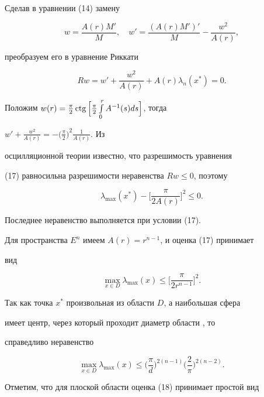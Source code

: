 \begin{pf} 


Сделав в уравнении (14) замену 


$$ 


w=\frac{A(r)M'}{M},\quad 


w'=\frac{(A(r)M')'}{M}-\frac{w^2}{A(r)}, 


$$ 


преобразуем его в уравнение Риккати 


$$ 


R w=w'+\frac{w^2}{A(r)}+A(r)\lambda_n(x^*)=0. 


$$ 


Положим $w(r)=\frac{\pi}{2}\ctg\Big[\frac{\pi}{2}\int\limits^r_0 


A^{-1}(s)ds\Big]$, тогда 


$w'+\frac{w^2}{A(r)}=-\big(\frac{\pi}{2}\big)^2\frac{1}{A(r)}$. Из 


осцилляционной теории \cite{2} известно, что разрешимость уравнения 


(17) равносильна разрешимости неравенства $R w\le 0$, поэтому 


$$ 


\lambda_{\max}(x^*)-\bigg[\frac{\pi}{2A(r)}\bigg]^2\le0. 


$$ 


Последнее неравенство выполняется при условии (17). 


Для пространства $E^n$ имеем $A(r)=r^{n-1}$, и оценка (17) принимает 


вид 


$$ 


\max_{x\in D}\lambda_{\max}(x)\le\bigg[ 


\frac{\pi}{2r^{n-1}}\bigg]^2. 


$$ 


Так как точка $x^*$ произвольная из области $D$, а наибольшая сфера 


имеет центр, через который проходит диаметр области \cite{7}, то 


справедливо неравенство 


\begin{equation} 


\max_{x\in D}\lambda_{\max}(x)\le\bigg(\frac{\pi}{d} 


\bigg)^{2(n-1)}\bigg(\frac{2}{\pi}\bigg)^{2(n-2)}. 


\end{equation} 


Отметим, что для плоской области оценка (18) принимает простой вид 



\end{pf}
